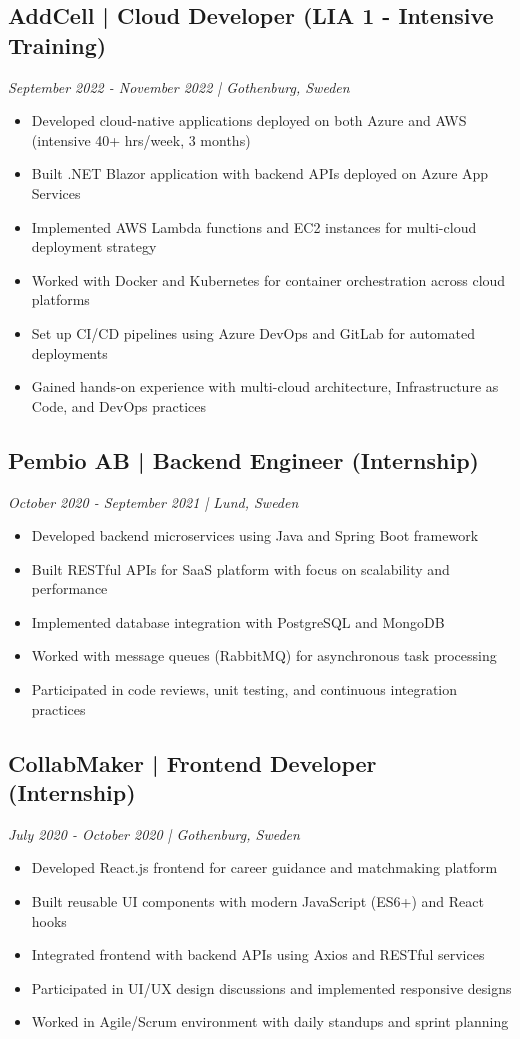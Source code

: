 \documentclass[11pt,a4paper]{article}
\begin{document}
\subsection*{AddCell | Cloud Developer (LIA 1 - Intensive Training)}
\textit{September 2022 - November 2022 | Gothenburg, Sweden}
\begin{itemize}[noitemsep]
\item Developed cloud-native applications deployed on both Azure and AWS (intensive 40+ hrs/week, 3 months)
\item Built .NET Blazor application with backend APIs deployed on Azure App Services
\item Implemented AWS Lambda functions and EC2 instances for multi-cloud deployment strategy
\item Worked with Docker and Kubernetes for container orchestration across cloud platforms
\item Set up CI/CD pipelines using Azure DevOps and GitLab for automated deployments
\item Gained hands-on experience with multi-cloud architecture, Infrastructure as Code, and DevOps practices
\end{itemize}

\subsection*{Pembio AB | Backend Engineer (Internship)}
\textit{October 2020 - September 2021 | Lund, Sweden}
\begin{itemize}[noitemsep]
\item Developed backend microservices using Java and Spring Boot framework
\item Built RESTful APIs for SaaS platform with focus on scalability and performance
\item Implemented database integration with PostgreSQL and MongoDB
\item Worked with message queues (RabbitMQ) for asynchronous task processing
\item Participated in code reviews, unit testing, and continuous integration practices
\end{itemize}

\subsection*{CollabMaker | Frontend Developer (Internship)}
\textit{July 2020 - October 2020 | Gothenburg, Sweden}
\begin{itemize}[noitemsep]
\item Developed React.js frontend for career guidance and matchmaking platform
\item Built reusable UI components with modern JavaScript (ES6+) and React hooks
\item Integrated frontend with backend APIs using Axios and RESTful services
\item Participated in UI/UX design discussions and implemented responsive designs
\item Worked in Agile/Scrum environment with daily standups and sprint planning
\end{itemize}
\end{document}
